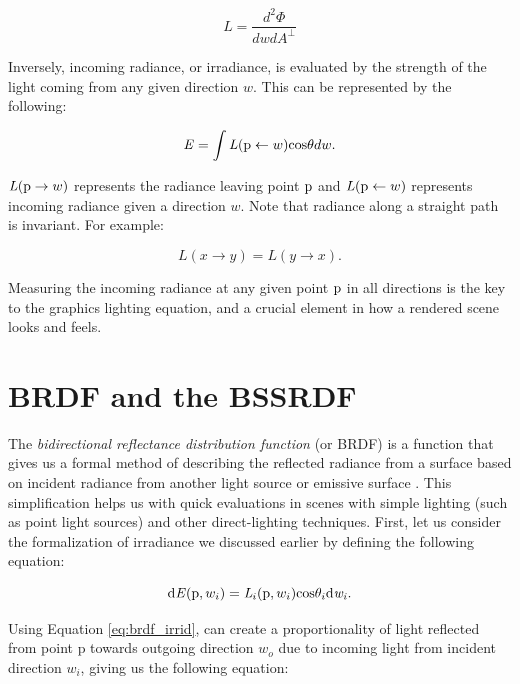 \documentclass[12pt]{ucthesis}
\begin{document}
\begin{equation}
\mathit{L} = \frac{\mathit{d^{2}\Phi}}{\mathit{dwdA}^\perp}
\label{eq:radiance}
\end{equation}

Inversely, incoming radiance, or irradiance, is evaluated by the strength of the light coming from any given direction $w$.  This  can be represented by the following:

\begin{equation}
\mathit{E} = \int\mathit{L}(\textup{p} \leftarrow w)\textup{cos}\theta dw.
\label{eq:irradiance}
\end{equation}

$\mathit{L}(\textup{p} \to w)$ represents the radiance leaving point $\textup{p}$ and $\mathit{L}(\textup{p} \leftarrow w)$ represents incoming radiance given a direction $w$.  Note that radiance along a straight path is invariant.  For example:

\begin{equation}
L(x \to y) = L(y \to x).
\label{eq:invariance}
\end{equation}

Measuring the incoming radiance at any given point $\textup{p}$ in all directions is the key to the graphics lighting equation, and a crucial element in how a rendered scene looks and feels.

\section{BRDF and the BSSRDF}

The \textit{bidirectional reflectance distribution function} (or BRDF) is a function that gives us a formal method of describing the reflected radiance from a surface based on incident radiance from another light source or emissive surface \cite{pbrt}.  This simplification helps us with quick evaluations in scenes with simple lighting (such as point light sources) and other direct-lighting techniques.  First, let us consider the formalization of irradiance we discussed earlier by defining the following equation:

\begin{equation}
\textup{d}\mathit{E}(\textup{p}, w_{i}) = \mathit{L}_{i}(\textup{p}, w_{i})\textup{cos}\theta_{i} \textup{d}\mathit{w_{i}}.
\label{eq:brdf_irrid}
\end{equation}

Using Equation \ref{eq:brdf_irrid}, can create a proportionality of light reflected from point p towards outgoing direction $w_o$ due to incoming light from incident direction $w_i$, giving us the following equation:
\end{document}
